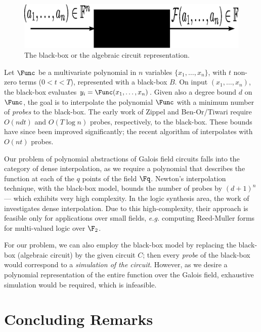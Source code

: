 \begin{figure}[hbt]
\centerline{
\includegraphics[scale=0.45]{figures/blackbox.eps}
}
\caption{The black-box or the algebraic circuit representation.}
\label{fig:blackbox}
\end{figure}

Let $\Func$ be a multivariate polynomial in $n$ variables $\{x_1, \dots,
x_n\}$, with $t$ non-zero terms ($0 < t < T$), represented with a
black-box $B$. On input $(x_1, \dots, x_n)$,
the black-box evaluates $y_i = \Func(x_1, \dots, x_n)$. Given also a
degree bound $d$ on $\Func$, the goal is to interpolate the polynomial
$\Func$ with a minimum number of {\it probes} to the black-box. The early
work of Zippel \cite{zippel:interpolate} and
Ben-Or/Tiwari \cite{ben-or-tiwari:interpolate} require $O(ndt)$ and
$O(T \log n)$ probes, respectively, to the black-box. These bounds
have since been improved significantly; the recent algorithm of
\cite{monagan:interpolate} interpolates with $O(nt)$ probes.  

Our problem of polynomial abstractions of Galois field circuits 
falls into the category of dense interpolation, as we
require a polynomial that describes the function at each of the $q$
points of the field $\Fq$. Newton's interpolation technique, with the
black-box model, bounds the number of probes by $(d+1)^n$ --- which 
exhibits very high complexity. In the logic synthesis area, the work of
\cite{zilic:interpolate} investigates dense interpolation. Due to this
high-complexity, their approach is feasible only for applications over
small fields, {\it e.g.} computing  Reed-Muller forms for multi-valued
logic over $\F_2$.  

For our problem,
we can also employ the black-box model by replacing the black-box
(algebraic circuit) by the given circuit $C$; then every {\it probe}
of the black-box would correspond to a {\it simulation of the
  circuit}. However, as we desire a polynomial representation of the entire
function over the Galois field, exhaustive simulation would be required, 
which is infeasible.

\section{Concluding Remarks}

